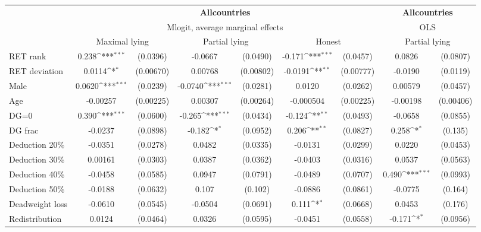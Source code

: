 \def\sym#1{\ifmmode^{#1}\else\(^{#1}\)\fi}
\begin{tabular}{l|cccccc|cc}
\hline\hline
&\multicolumn{6}{c|}{\bf All\space{}countries}&\multicolumn{2}{c}{\bf All\space{}countries}\\ &\multicolumn{6}{c|}{Mlogit, average marginal effects }&\multicolumn{2}{c}{OLS}\\
                &\multicolumn{2}{c}{Maximal lying}&\multicolumn{2}{c}{Partial lying}&\multicolumn{2}{c|}{Honest}  &\multicolumn{2}{c}{Partial lying}\\
\hline
RET rank        &    0.238\sym{***}& (0.0396)&  -0.0667         & (0.0490)&   -0.171\sym{***}& (0.0457)&   0.0826         & (0.0807)\\
RET deviation   &   0.0114\sym{*}  &(0.00670)&  0.00768         &(0.00802)&  -0.0191\sym{**} &(0.00777)&  -0.0190         & (0.0119)\\
Male            &   0.0620\sym{***}& (0.0239)&  -0.0740\sym{***}& (0.0281)&   0.0120         & (0.0262)&  0.00579         & (0.0457)\\
Age             & -0.00257         &(0.00225)&  0.00307         &(0.00264)&-0.000504         &(0.00225)& -0.00198         &(0.00406)\\
DG=0          &    0.390\sym{***}& (0.0600)&   -0.265\sym{***}& (0.0434)&   -0.124\sym{**} & (0.0493)&  -0.0658         & (0.0855)\\
DG frac         &  -0.0237         & (0.0898)&   -0.182\sym{*}  & (0.0952)&    0.206\sym{**} & (0.0827)&    0.258\sym{*}  &  (0.135)\\
Deduction 20\%&  -0.0351         & (0.0278)&   0.0482         & (0.0335)&  -0.0131         & (0.0299)&   0.0220         & (0.0453)\\
Deduction 30\%&  0.00161         & (0.0303)&   0.0387         & (0.0362)&  -0.0403         & (0.0316)&   0.0537         & (0.0563)\\
Deduction 40\%&  -0.0458         & (0.0585)&   0.0947         & (0.0791)&  -0.0489         & (0.0707)&    0.490\sym{***}& (0.0993)\\
Deduction 50\%&  -0.0188         & (0.0632)&    0.107         &  (0.102)&  -0.0886         & (0.0861)&  -0.0775         &  (0.164)\\
Deadweight loss&  -0.0610         & (0.0545)&  -0.0504         & (0.0691)&    0.111\sym{*}  & (0.0668)&   0.0453         &  (0.176)\\
Redistribution&   0.0124         & (0.0464)&   0.0326         & (0.0595)&  -0.0451         & (0.0558)&   -0.171\sym{*}  & (0.0956)\\

\end{tabular}
